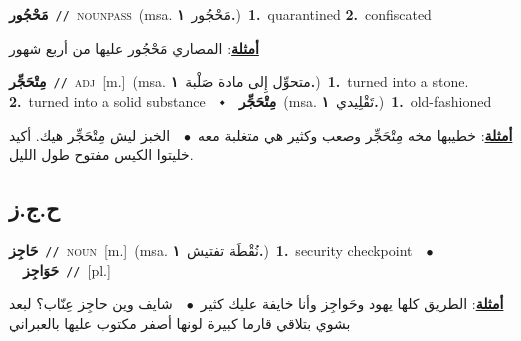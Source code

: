 \documentclass[10pt,a4paper,twoside]{article} %
\begin{document}
\begin{multicols}{2}
{\setlength\topsep{0pt}\textbf{\foreignlanguage{arabic}{مَحْجُور}}\ {\color{gray}\texttt{//}\color{black}}\ \textsc{noun\textunderscore pass}\ \color{gray}(msa. \foreignlanguage{arabic}{مَحْجُور}~\foreignlanguage{arabic}{\textbf{١.}})\color{black}\ \textbf{1.}~quarantined  \textbf{2.}~confiscated\  \begin{flushright}\color{gray}\foreignlanguage{arabic}{\textbf{\underline{\foreignlanguage{arabic}{أمثلة}}}: المصاري مَحْجُور عليها من أربع شهور}\end{flushright}\color{black}} \vspace{2mm}

{\setlength\topsep{0pt}\textbf{\foreignlanguage{arabic}{مِتْحَجِّر}}\ {\color{gray}\texttt{//}\color{black}}\ \textsc{adj}\ [m.]\ \color{gray}(msa. \foreignlanguage{arabic}{متحوِّل إِلى مادة صَلْبة}~\foreignlanguage{arabic}{\textbf{١.}})\color{black}\ \textbf{1.}~turned into a stone.  \textbf{2.}~turned into a solid substance\ \ $\smblkdiamond$\ \ \setlength\topsep{0pt}\textbf{\foreignlanguage{arabic}{مِتْحَجِّر}}\ \color{gray}(msa. \foreignlanguage{arabic}{تَقْلِيدي}~\foreignlanguage{arabic}{\textbf{١.}})\color{black}\ \textbf{1.}~old-fashioned\  \begin{flushright}\color{gray}\foreignlanguage{arabic}{\textbf{\underline{\foreignlanguage{arabic}{أمثلة}}}: خطيبها مخه مِتْحَجِّر وصعب وكثير هي متغلبة معه\ $\bullet$\ \  الخبز ليش مِتْحَجِّر هيك. أكيد خليتوا الكيس مفتوح طول الليل.}\end{flushright}\color{black}} \vspace{2mm}

\vspace{-3mm}
\subsection*{\color{blue}\foreignlanguage{arabic}{ح.ج.ز}\color{blue}{}} 

{\setlength\topsep{0pt}\textbf{\foreignlanguage{arabic}{حَاجِز}}\ {\color{gray}\texttt{//}\color{black}}\ \textsc{noun}\ [m.]\ \color{gray}(msa. \foreignlanguage{arabic}{نُقْطَة تفتيش}~\foreignlanguage{arabic}{\textbf{١.}})\color{black}\ \textbf{1.}~security checkpoint\ \ $\bullet$\ \ \setlength\topsep{0pt}\textbf{\foreignlanguage{arabic}{حَوَاجِز}}\ {\color{gray}\texttt{//}\color{black}}\ [pl.]\  \begin{flushright}\color{gray}\foreignlanguage{arabic}{\textbf{\underline{\foreignlanguage{arabic}{أمثلة}}}: الطريق كلها يهود وحَواجِز وأنا خايفة عليك كثير\ $\bullet$\ \  شايف وين حاجِز عِنّاب؟ لبعد بشوي بتلاقي قارما كبيرة لونها أصفر مكتوب عليها بالعبراني}\end{flushright}\color{black}} \vspace{2mm}


\end{multicols}
\end{document}
